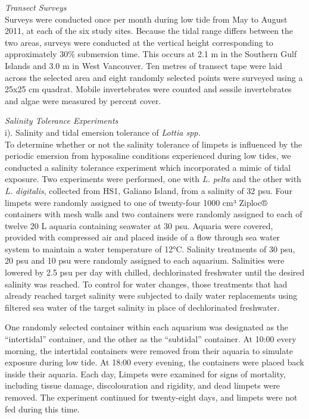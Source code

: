 \documentclass[
  11pt,
]{article}
\begin{document}
\emph{Transect Surveys}\\
Surveys were conducted once per month during low tide from May to August 2011, at each of the six study sites. Because the tidal range differs between the two areas, surveys were conducted at the vertical height corresponding to approximately 30\% submersion time. This occurs at 2.1 m in the Southern Gulf Islands and 3.0 m in West Vancouver. Ten metres of transect tape were laid across the selected area and eight randomly selected points were surveyed using a 25x25 cm quadrat. Mobile invertebrates were counted and sessile invertebrates and algae were measured by percent cover.

\emph{Salinity Tolerance Experiments}\\
i). Salinity and tidal emersion tolerance of \emph{Lottia spp.}\\
To determine whether or not the salinity tolerance of limpets is influenced by the periodic emersion from hyposaline conditions experienced during low tides, we conducted a salinity tolerance experiment which incorporated a mimic of tidal exposure. Two experiments were performed, one with \emph{L. pelta} and the other with \emph{L. digitalis}, collected from HS1, Galiano Island, from a salinity of 32 psu. Four limpets were randomly assigned to one of twenty-four 1000 cm³ Ziploc® containers with mesh walls and two containers were randomly assigned to each of twelve 20 L aquaria containing seawater at 30 psu. Aquaria were covered, provided with compressed air and placed inside of a flow through sea water system to maintain a water temperature of 12°C. Salinity treatments of 30 psu, 20 psu and 10 psu were randomly assigned to each aquarium. Salinities were lowered by 2.5 psu per day with chilled, dechlorinated freshwater until the desired salinity was reached. To control for water changes, those treatments that had already reached target salinity were subjected to daily water replacements using filtered sea water of the target salinity in place of dechlorinated freshwater.

One randomly selected container within each aquarium was designated as the ``intertidal'' container, and the other as the ``subtidal'' container. At 10:00 every morning, the intertidal containers were removed from their aquaria to simulate exposure during low tide. At 18:00 every evening, the containers were placed back inside their aquaria. Each day, Limpets were examined for signs of mortality, including tissue damage, discolouration and rigidity, and dead limpets were removed. The experiment continued for twenty-eight days, and limpets were not fed during this time.
\end{document}
